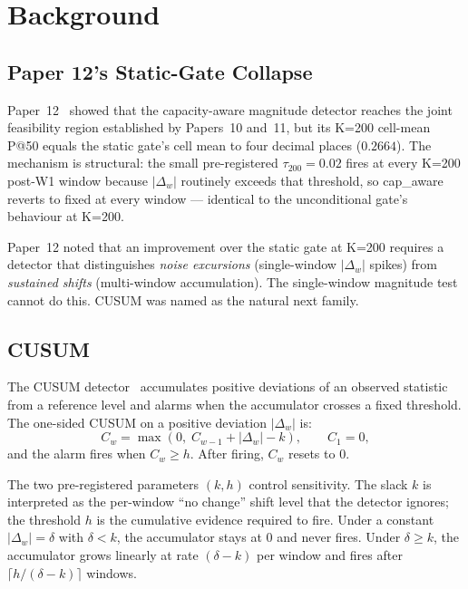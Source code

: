 \section{Background}

\subsection{Paper 12's Static-Gate Collapse}

Paper~12~\cite{paper12capaware} showed that the capacity-aware
magnitude detector reaches the joint feasibility region established
by Papers~10 and~11, but its K=200 cell-mean P@50 equals the static
gate's cell mean to four decimal places ($0.2664$). The mechanism is
structural: the small pre-registered $\tau_{200} = 0.02$ fires at
every K=200 post-W1 window because $|\Delta_w|$ routinely exceeds
that threshold, so cap\_aware reverts to fixed at every window ---
identical to the unconditional gate's behaviour at K=200.

Paper~12 noted that an improvement over the static gate at K=200
requires a detector that distinguishes \textit{noise excursions}
(single-window $|\Delta_w|$ spikes) from \textit{sustained shifts}
(multi-window accumulation). The single-window magnitude test
cannot do this. CUSUM was named as the natural next family.

\subsection{CUSUM}

The CUSUM detector~\cite{page1954cusum} accumulates positive
deviations of an observed statistic from a reference level and
alarms when the accumulator crosses a fixed threshold. The
one-sided CUSUM on a positive deviation $|\Delta_w|$ is:
\begin{equation}
C_w = \max(0,\; C_{w-1} + |\Delta_w| - k), \qquad C_1 = 0,
\end{equation}
and the alarm fires when $C_w \geq h$. After firing, $C_w$ resets
to $0$.

The two pre-registered parameters $(k, h)$ control sensitivity. The
slack $k$ is interpreted as the per-window ``no change'' shift level
that the detector ignores; the threshold $h$ is the cumulative
evidence required to fire. Under a constant $|\Delta_w| = \delta$
with $\delta < k$, the accumulator stays at $0$ and never fires.
Under $\delta \geq k$, the accumulator grows linearly at rate
$(\delta - k)$ per window and fires after $\lceil h / (\delta - k)
\rceil$ windows.

